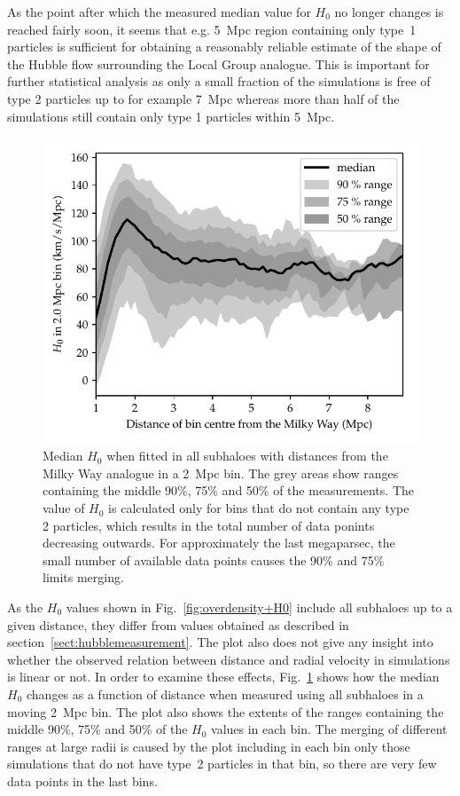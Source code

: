 \documentclass[english, twoside]{HYgradu}
\begin{document}
As the point after which the measured median value for $H_0$ no longer changes is reached fairly soon, it seems that e.g. 5~Mpc region containing only type~1 particles is sufficient for obtaining a reasonably reliable estimate of the shape of the Hubble flow surrounding the Local Group analogue. This is important for further statistical analysis as only a small fraction of the simulations is free of type 2 particles up to for example 7~Mpc whereas more than half of the simulations still contain only type 1 particles within 5~Mpc.

\begin{figure}
    \centering
    \includegraphics{kuvat/shelledH0.pdf}
    \caption{Median $H_0$ when fitted in all subhaloes with distances from the Milky Way analogue in a 2~Mpc bin. The grey areas show ranges containing the middle 90\%, 75\% and 50\% of the measurements. The value of $H_0$ is calculated only for bins that do not contain any type 2 particles, which results in the total number of data ponints decreasing outwards. For approximately the last megaparsec, the small number of available data points causes the 90\% and 75\% limits merging.}\label{fig:shelledH0}
\end{figure}

As the $H_0$ values shown in Fig.~\ref{fig:overdensity+H0} include all subhaloes up to a given distance, they  differ from values obtained as described in section~\ref{sect:hubblemeasurement}. The plot also does not give  any insight into whether the observed relation between distance and radial velocity in simulations is linear or not. In order to examine these effects, Fig.~\ref{fig:shelledH0} shows how the median $H_0$ changes as a function of distance when measured using all subhaloes in a moving 2~Mpc bin. The plot also shows the extents of the ranges containing the middle 90\%, 75\% and 50\% of the $H_0$ values in each bin. The merging of different ranges at large radii is caused by the plot including in each bin only those simulations that do not have type~2 particles in that bin, so there are very few data points in the last bins.
\end{document}
